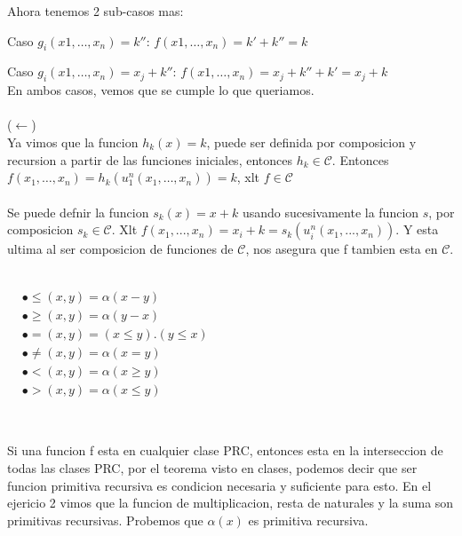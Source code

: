 \documentclass{report}
\begin{document}
Ahora tenemos 2 sub-casos mas:

Caso $g_i(x1, \ldots, x_n) = k''$:  $f(x1, \ldots, x_n) = k' + k'' = k$

Caso $g_i(x1, \ldots, x_n) = x_j + k''$: $f(x1, \ldots, x_n) = x_j + k'' + k' = x_j + k$
\\
En ambos casos, vemos que se cumple lo que queriamos.
\\\\

($\leftarrow$)\\
Ya vimos que la funcion $h_k(x) = k$, puede ser definida por composicion y recursion a partir de
las funciones iniciales, entonces $h_k \in \mathcal{C}$.
Entonces $f(x_1 , \ldots , x_n) = h_k(u_1^n(x_1 , \ldots , x_n)) = k$, xlt $f \in \mathcal{C}$
\\\\
Se puede defnir la funcion $s_k(x) = x + k$ usando sucesivamente la funcion $s$, por composicion $s_k \in \mathcal{C}$.
Xlt $f(x_1, ... , x_n) = x_i  + k = s_k(u_i^n(x_1, ... , x_n))$. Y esta ultima al ser composicion de funciones de
$\mathcal{C}$, nos asegura que f tambien esta en $\mathcal{C}$.


\sol \\

$\begin{aligned}&\bullet\leq(x,y)=\alpha(x-y)\\&\bullet\geq(x,y)=\alpha(y-x)\\&\bullet=(x,y)=(x\leq y).(y\leq x)\\&\bullet\neq(x,y)=\alpha(x=y)\\&\bullet<(x,y)=\alpha(x\geq y)\\&\bullet>(x,y)=\alpha(x\leq y)\end{aligned}$

~


Si una funcion f esta en cualquier clase PRC, entonces esta en la interseccion de todas las clases PRC, por el teorema visto en clases, podemos decir que
ser funcion primitiva recursiva es condicion necesaria y suficiente para esto.
En el ejericio 2 vimos que la funcion de multiplicacion, resta de naturales y la suma son primitivas recursivas. Probemos que $\alpha(x)$ es primitiva recursiva.
\end{document}
